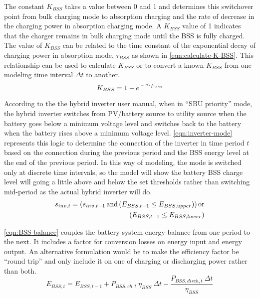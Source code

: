 The constant $K_{BSS}$ takes a value between 0 and 1 and determines this switchover point from bulk charging mode to absorption charging and the rate of decrease in the charging power in absorption charging mode. A $K_{BSS}$ value of 1 indicates that the charger remains in bulk charging mode until the BSS is fully charged. The value of $K_{BSS}$ can be related to the time constant of the exponential decay of charging power in absorption mode, $\tau_{BSS}$ as shown in \autoref{eqn:calculate-K-BSS}. This relationship can be used to calculate $K_{BSS}$ or to convert a known $K_{BSS}$ from one modeling time interval $\Delta t$ to another.
%
\begin{equation}
\label{eqn:calculate-K-BSS}
K_{BSS} = 1 - e^{\sfrac{-\Delta t}{\tau_{BSS}}}
\end{equation}

According to the the hybrid inverter user manual, when in ``SBU priority'' mode, the hybrid inverter switches from PV/battery source to utility source when the battery goes below a minimum voltage level and switches back to the battery when the battery rises above a minimum voltage level. \autoref{eqn:inverter-mode} represents this logic to determine the connection of the inverter in time period $t$ based on the connection during the previous period and the BSS energy level at the end of the previous period. In this way of modeling, the mode is switched only at discrete time intervals, so the model will show the battery BSS charge level will going a little above and below the set thresholds rather than switching mid-period as the actual hybrid inverter will do.
%
\begin{equation}
\label{eqn:inverter-mode}
\begin{split}
s_{inv,t} = \left(s_{inv,t-1} \operatorname{and} \left(E_{BSS,t-1} \le E_{BSS,upper} \right) \right)
\operatorname{or}
\\
\left( E_{BSS,t-1} \le E_{BSS,lower} \right)
\end{split}
\end{equation}

\autoref{eqn:BSS-balance} couples the battery system energy balance from one period to the next. It includes a factor for conversion losses on energy input and energy output. An alternative formulation would be to make the efficiency factor be ``round trip'' and only include it on one of charging or discharging power rather than both.
%
\begin{equation}
\label{eqn:BSS-balance}
E_{BSS,t} = E_{BSS,t-1} + P_{BSS,ch,t} \ \eta_{BSS} \ \Delta t - \frac{P_{BSS,disch,t} \ \Delta t}{\eta_{BSS}}
\end{equation}

